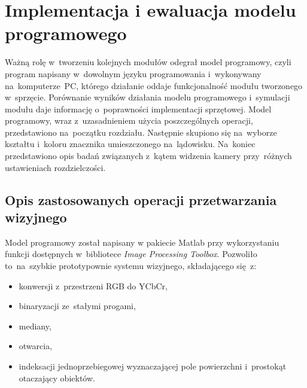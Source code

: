 \chapter{Implementacja i ewaluacja modelu programowego}
\label{cha:implementacja_modelu}

Ważną rolę w~tworzeniu kolejnych modułów odegrał model programowy, czyli program napisany w~dowolnym języku programowania i~wykonywany na~komputerze~PC, którego działanie oddaje funkcjonalność modułu tworzonego w~sprzęcie.
Porównanie wyników działania modelu programowego i~symulacji modułu daje informację o~poprawności implementacji sprzętowej. 
Model programowy, wraz z~uzasadnieniem użycia poszczególnych operacji, przedstawiono na~początku rozdziału.
Następnie skupiono się na~wyborze kształtu i~koloru znacznika umieszczonego na~lądowisku.
Na~koniec przedstawiono opis badań związanych z~kątem widzenia kamery przy~różnych ustawieniach rozdzielczości.

\section{Opis zastosowanych operacji przetwarzania wizyjnego}
\label{sec:opis_operacji}
Model programowy został napisany w pakiecie Matlab przy wykorzystaniu funkcji dostępnych w~bibliotece \textit{Image Processing Toolbox}. 
Pozwoliło to~na~szybkie prototypownie systemu wizyjnego, składającego się~z:
\begin{itemize}
	\item konwersji z~przestrzeni RGB do YCbCr,
	\item binaryzacji ze~stałymi progami,
	\item mediany,
	\item otwarcia,
	\item indeksacji jednoprzebiegowej wyznaczającej pole powierzchni i~prostokąt otaczający obiektów.
\end{itemize}

